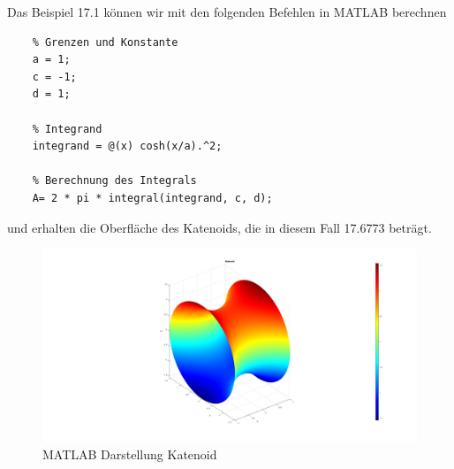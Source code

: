 Das Beispiel 17.1 können wir mit den folgenden Befehlen in MATLAB berechnen

\begin{lstlisting}
	% Grenzen und Konstante
	a = 1;
	c = -1;
	d = 1;
	
	% Integrand
	integrand = @(x) cosh(x/a).^2;
	
	% Berechnung des Integrals
	A= 2 * pi * integral(integrand, c, d);
\end{lstlisting}
%
und erhalten die Oberfläche des Katenoids, die in diesem Fall 17.6773 beträgt.


\begin{figure}
	\centering
	\includegraphics[width=0.7\linewidth]{papers/minimalflaechen/Katenoid}

	\caption{MATLAB Darstellung Katenoid}
	\label{fig:katenoid}
\end{figure}



